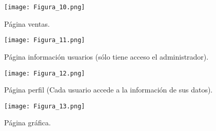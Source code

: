 \documentclass{article}
\begin{document}
\begin{figure}[h]
\centering
\texttt{[image: Figura\_10.png]}
\caption{\label{fig:11}Página ventas.}
\end{figure}

\begin{figure}[h]
\centering
\texttt{[image: Figura\_11.png]}
\caption{\label{fig:12}Página información usuarios (sólo tiene acceso el administrador).}
\end{figure}

\begin{figure}[h]
\centering
\texttt{[image: Figura\_12.png]}
\caption{\label{fig:13}Página perfil (Cada usuario accede a la información de sus datos).}
\end{figure}

\begin{figure}[h]
\centering
\texttt{[image: Figura\_13.png]}
\caption{\label{fig:14}Página gráfica.}
\end{figure}

% 
% 
\end{document}
